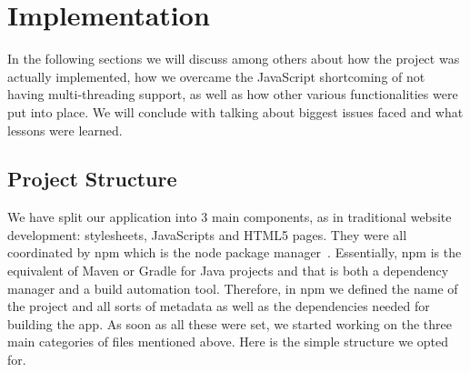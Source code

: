 \documentclass{l4proj}
\begin{document}
\chapter{Implementation}
\label{implementation}

In the following sections we will discuss among others about how the project was actually implemented, how we overcame the
JavaScript shortcoming of not having multi-threading support, as well as how other various functionalities were put
into place. We will conclude with talking about biggest issues faced and what lessons were learned. 

\section{Project Structure}

We have split our application into 3 main components, as in traditional website development: stylesheets, JavaScripts
and HTML5 pages. They were all coordinated by npm which is the node package manager~\cite{npm}. Essentially,
npm is the equivalent of Maven or Gradle for Java projects and that is both a dependency manager and a build automation
tool. Therefore, in npm we defined the name of the project and all sorts of metadata as well as the dependencies needed
for building the app. As soon as all these were set, we started working on the three main categories of files mentioned
above. Here is the simple structure we opted for.
\end{document}
